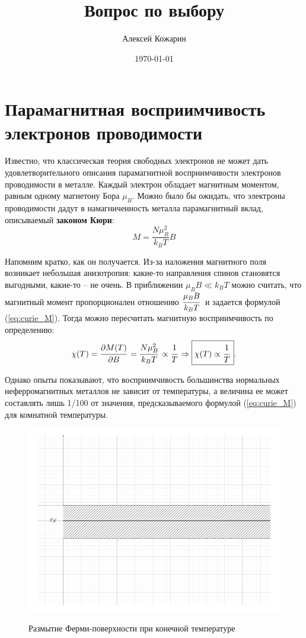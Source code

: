 \documentclass[a4paper, 12pt, openany]{book}
\title{Вопрос по выбору}
\author{Алексей Кожарин}
\date{\today}
\begin{document}
	
	\section{Парамагнитная восприимчивость электронов проводимости}
    Известно, что классическая теория свободных электронов не может дать удовлетворительного описания парамагнитной восприимчивости электронов проводимости в металле. 
    Каждый электрон обладает магнитным моментом, равным одному магнетону Бора $\mu_B$.
    Можно было бы ожидать, что электроны проводимости дадут в намагниченность металла парамагнитный вклад, описываемый \textbf{законом Кюри}:
    \begin{equation}
        \label{eq:curie_M}
        M=\frac{N \mu_{B}^{2}}{k_{B} T} B
    \end{equation}

    Напомним кратко, как он получается.
    Из-за наложения магнитного поля возникает небольшая анизотропия: какие-то направления спинов становятся выгодными, какие-то -- не очень.
    В приближении $\mu_B B \ll k_{B}T$ можно считать, что магнитный момент пропорционален отношению $\cfrac{\mu_{B}B}{k_{B}T}\, $ и задается формулой (\ref{eq:curie_M}).
    Тогда можно пересчитать магнитную восприимчивость по определению:
    \begin{equation*}
        \chi (T) = \cfrac{\partial M (T)}{\partial B}\, =
        \cfrac{N \mu_{B}^2}{k_{B}T}\, \propto \cfrac{1}{T}\,
        \Rightarrow \boxed{\chi (T) \propto \cfrac{1}{T}\, } .
    \end{equation*}

    Однако опыты показывают, что восприимчивость большинства нормальных неферромагнитных металлов не зависит от температуры,
    а величина ее может составлять лишь 1/100 от значения, предсказываемого формулой (\ref{eq:curie_M}) для комнатной температуры.

    \begin{figure}
        \includegraphics[width=\linewidth]{fermi_razm}
        \label{fig:fermi_razm}
        \caption{Размытие Ферми-поверхности при конечной температуре}
    \end{figure}
\end{document}

